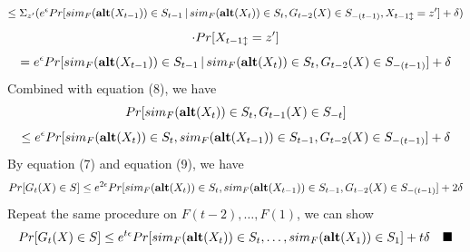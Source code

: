 \documentclass[11pt]{article}
\begin{document}
\[
\leq  \Sigma_{z'} (e^{\epsilon}Pr[sim_{F}({\bf alt}(X_{t-1})) \in S_{t-1}\,|\,sim_{F} ({\bf alt}(X_{t})) \in S_{t}, G_{t-2}(X) \in S_{-(t-1)}, X_{t-1 \updownarrow}=z'] +\delta)
\]
\[
\cdot Pr [X_{t-1 \updownarrow}=z']
\]
\[
=e^{\epsilon}Pr[sim_{F}({\bf alt}(X_{t-1})) \in S_{t-1}\,|\,sim_{F} ({\bf alt}(X_{t})) \in S_{t}, G_{t-2}(X) \in S_{-(t-1)}] +\delta
\]
Combined with equation (8), we have
\[
Pr[ sim_{F} ({\bf alt}(X_{t})) \in S_{t}, G_{t-1}(X) \in S_{-t}]
\]
\begin{equation}
\leq e^{\epsilon}Pr[ {sim_{F} ({\bf alt}(X_{t})) \in S_{t}, {sim_{F}({\bf alt}(X_{t-1})) \in S_{t-1}}, G_{t-2}(X) \in S_{-(t-1)}}] +\delta
\end{equation}
By equation (7) and equation (9), we have
\[
Pr[G_{t}(X) \in S] \leq e^{2\epsilon} Pr[ {sim_{F} ({\bf alt}(X_{t})) \in S_{t}, {sim_{F}({\bf alt}(X_{t-1})) \in S_{t-1}}, G_{t-2}(X) \in S_{-(t-1)}}]+ 2\delta
\]
Repeat the same procedure on $F(t-2), \dots , F(1)$, we can show
\[
Pr[G_{t}(X) \in S] \leq e^{t\epsilon} Pr[ {sim_{F} ({\bf alt}(X_{t})) \in S_{t}, \dots , {sim_{F}({\bf alt}(X_{1})) \in S_{1}}}]+ t\delta \quad \blacksquare
\]
\end{document}
